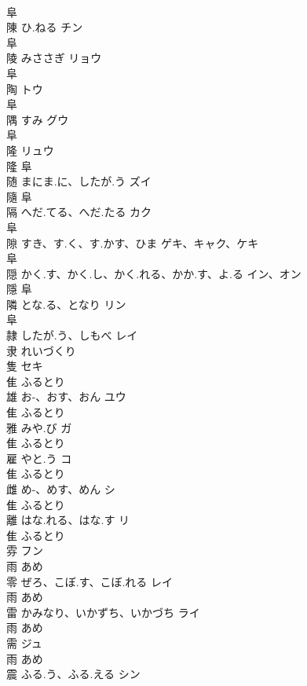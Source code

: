 \documentclass[8pt]{extreport}
\begin{document}
\begin{CJK}{UTF8}{min}
\\	阜				
\\	陳	ひ.ねる	チン	
\\	阜				
\\	陵	みささぎ	リョウ	
\\	阜				
\\	陶		トウ	
\\	阜				
\\	隅	すみ	グウ	
\\	阜				
\\	隆		リュウ	
\\	隆	阜				
\\	随	まにま.に、したが.う	ズイ	
\\	隨	阜				
\\	隔	へだ.てる、へだ.たる	カク	
\\	阜				
\\	隙	すき、す.く、す.かす、ひま	ゲキ、キャク、ケキ	
\\	阜				
\\	隠	かく.す、かく.し、かく.れる、かか.す、よ.る	イン、オン	
\\	隱	阜				
\\	隣	とな.る、となり	リン	
\\	阜				
\\	隷	したが.う、しもべ	レイ	
\\	隶		れいづくり		
\\	隻		セキ	
\\	隹		ふるとり		
\\	雄	お-、おす、おん	ユウ	
\\	隹		ふるとり		
\\	雅	みや.び	ガ	
\\	隹		ふるとり		
\\	雇	やと.う	コ	
\\	隹		ふるとり		
\\	雌	め-、めす、めん	シ	
\\	隹		ふるとり		
\\	離	はな.れる、はな.す	リ	
\\	隹		ふるとり		
\\	雰		フン	
\\	雨		あめ		
\\	零	ぜろ、こぼ.す、こぼ.れる	レイ	
\\	雨		あめ		
\\	雷	かみなり、いかずち、いかづち	ライ	
\\	雨		あめ		
\\	需		ジュ	
\\	雨		あめ		
\\	震	ふる.う、ふる.える	シン	

\end{CJK}
\end{document}
